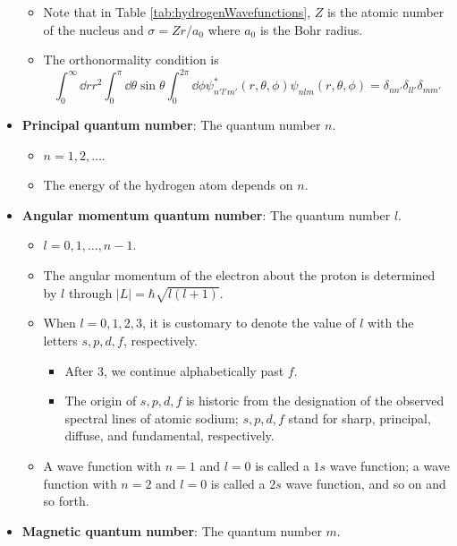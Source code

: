 \documentclass[../notes.tex]{subfiles}
\begin{document}
\begin{itemize}
\begin{table}[h!]
        \label{tab:hydrogenWavefunctions}
    \end{table}
    \begin{itemize}
        \item Note that in Table \ref{tab:hydrogenWavefunctions}, $Z$ is the atomic number of the nucleus and $\sigma=Zr/a_0$ where $a_0$ is the Bohr radius.
        \item The orthonormality condition is
        \begin{equation*}
            \int_0^\infty\dd{r}r^2\int_0^\pi\dd{\theta}\sin\theta\int_0^{2\pi}\dd{\phi}\psi_{n'l'm'}^*(r,\theta,\phi)\psi_{nlm}(r,\theta,\phi) = \delta_{nn'}\delta_{ll'}\delta_{mm'}
        \end{equation*}
    \end{itemize}
    \item \textbf{Principal quantum number}: The quantum number $n$.
    \begin{itemize}
        \item $n=1,2,\dots$.
        \item The energy of the hydrogen atom depends on $n$.
    \end{itemize}
    \item \textbf{Angular momentum quantum number}: The quantum number $l$.
    \begin{itemize}
        \item $l=0,1,\dots,n-1$.
        \item The angular momentum of the electron about the proton is determined by $l$ through $|L|=\hbar\sqrt{l(l+1)}$.
        \item When $l=0,1,2,3$, it is customary to denote the value of $l$ with the letters $s,p,d,f$, respectively.
        \begin{itemize}
            \item After 3, we continue alphabetically past $f$.
            \item The origin of $s,p,d,f$ is historic from the designation of the observed spectral lines of atomic sodium; $s,p,d,f$ stand for sharp, principal, diffuse, and fundamental, respectively.
        \end{itemize}
        \item A wave function with $n=1$ and $l=0$ is called a $1s$ wave function; a wave function with $n=2$ and $l=0$ is called a $2s$ wave function, and so on and so forth.
    \end{itemize}
    \item \textbf{Magnetic quantum number}: The quantum number $m$.

\end{itemize}
\end{document}
